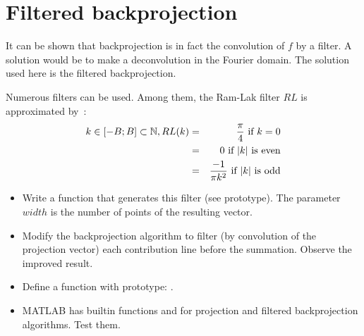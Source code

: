 \section{Filtered backprojection}
It can be shown that backprojection is in fact the convolution of $f$ by a filter. A solution would be to make a deconvolution in the Fourier domain. The solution used here is the filtered backprojection. 

Numerous filters can be used. Among them, the Ram-Lak filter $RL$ is approximated by~:
\begin{eqnarray*}
 k\in[-B;B]\subset \mathbb{N},  RL(k)           &=& \frac{\pi}{4}      \textrm{ if } k=0 \\
                              &=& 0                  \textrm{ if } |k| \textrm{ is even} \\
                              &=& \frac{-1}{\pi k^2}  \textrm{ if } |k| \textrm{ is odd}
\end{eqnarray*}

\begin{qbox}
\begin{itemize}
\item 
Write a function that generates this filter (see prototype). The parameter $width$  is the number of points  of the resulting vector.

\item Modify the backprojection algorithm to filter (by convolution of the projection vector) each contribution line before the summation. Observe the improved result.

\end{itemize}
\end{qbox}

\begin{mcomment}
\begin{mremark}

\begin{itemize}
\item Define a function with prototype: .
 \item MATLAB has builtin functions  and  for projection and filtered backprojection algorithms. Test them.
\end{itemize}

 
\end{mremark}
\end{mcomment}


